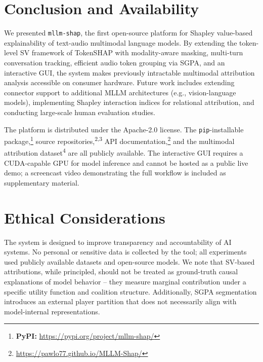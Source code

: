 \documentclass[11pt]{article}
\begin{document}
\section{Conclusion and Availability}
\label{sec:conclusion}

We presented \texttt{mllm-shap}, the first open-source platform for Shapley value-based explainability of text-audio multimodal language models.
By extending the token-level SV framework of TokenSHAP with modality-aware masking, multi-turn conversation tracking, efficient audio token grouping via SGPA, and an interactive GUI, the system makes previously intractable multimodal attribution analysis accessible on consumer hardware.
Future work includes extending connector support to additional MLLM architectures (e.g., vision-language models), implementing Shapley interaction indices for relational attribution, and conducting large-scale human evaluation studies.

The platform is distributed under the Apache-2.0 license.
The \texttt{pip}-installable package,\footnote{\textbf{PyPI:} \url{https://pypi.org/project/mllm-shap/}} source repositories,\textsuperscript{2,3} API documentation,\footnote{\url{https://pawlo77.github.io/MLLM-Shap/}} and the multimodal attribution dataset\textsuperscript{4} are all publicly available.
The interactive GUI requires a CUDA-capable GPU for model inference and cannot be hosted as a public live demo; a screencast video demonstrating the full workflow is included as supplementary material.

\section*{Ethical Considerations}
The system is designed to improve transparency and accountability of AI systems.
No personal or sensitive data is collected by the tool; all experiments used publicly available datasets and open-source models.
We note that SV-based attributions, while principled, should not be treated as ground-truth causal explanations of model behavior -- they measure marginal contribution under a specific utility function and coalition structure.
Additionally, SGPA segmentation introduces an external player partition that does not necessarily align with model-internal representations.
\end{document}
